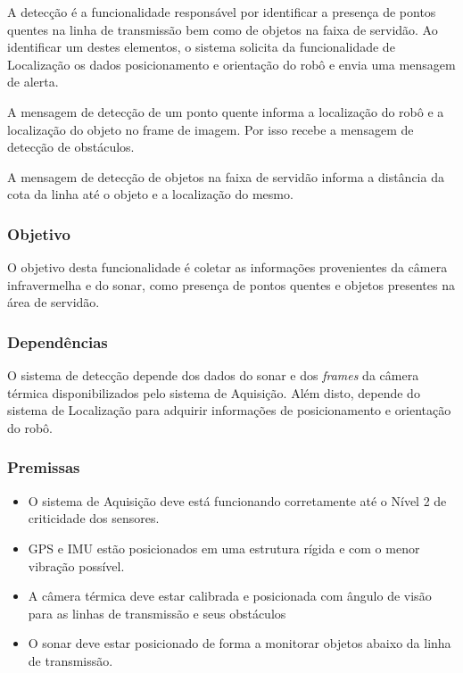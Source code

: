 A detecção é a funcionalidade responsável por identificar a presença de pontos quentes na linha de transmissão bem como de objetos na faixa de servidão. Ao identificar um destes elementos, o sistema solicita da funcionalidade de Localização os dados posicionamento e orientação do robô e envia uma mensagem de alerta.

A mensagem de detecção de um ponto quente informa a localização do robô e a localização do objeto no frame de imagem. Por isso recebe a mensagem de detecção de obstáculos. 

A mensagem de detecção de objetos na faixa de servidão informa a distância da cota da linha até o objeto e a localização do mesmo. 

\subsubsection{Objetivo}

O objetivo desta funcionalidade é coletar as informações provenientes da câmera infravermelha e do sonar, como presença de pontos quentes e objetos presentes na área de servidão. 

\subsubsection{Dependências}
O sistema de detecção depende dos dados do sonar e dos \textit{frames} da câmera térmica disponibilizados pelo sistema de Aquisição. Além disto, depende do sistema de Localização para adquirir informações de posicionamento e orientação do robô.

\subsubsection{Premissas}
\begin{itemize}
	\item O sistema de Aquisição deve está funcionando corretamente até o Nível 2 de criticidade dos sensores.
	\item GPS e IMU estão posicionados em uma estrutura rígida e com o menor vibração possível.
	\item A câmera térmica deve estar calibrada e posicionada com ângulo de visão para as linhas de transmissão e seus obstáculos
	\item O sonar deve estar posicionado de forma a monitorar objetos abaixo da linha de transmissão.            
\end{itemize}


